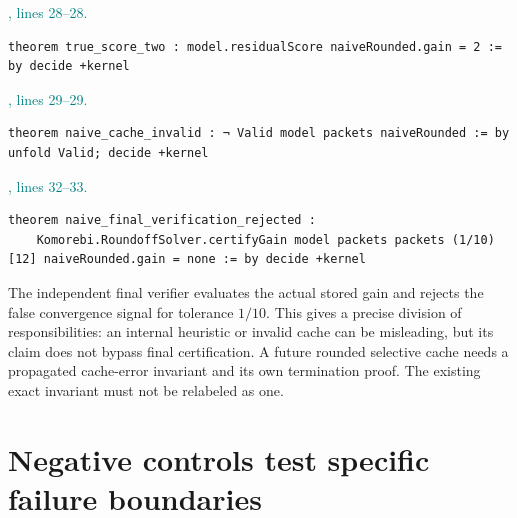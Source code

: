 \documentclass[11pt]{article}\usepackage{needspace}\renewcommand{\paperkind}{Lean companion}\setlength{\parskip}{0.35em}
\begin{document}
{\small\textcolor{teal}{, lines 28--28.}\par}

\begin{lstlisting}[style=BayesSource]
theorem true_score_two : model.residualScore naiveRounded.gain = 2 := by decide +kernel
\end{lstlisting}



{\small\textcolor{teal}{, lines 29--29.}\par}

\begin{lstlisting}[style=BayesSource]
theorem naive_cache_invalid : ¬ Valid model packets naiveRounded := by unfold Valid; decide +kernel
\end{lstlisting}



{\small\textcolor{teal}{, lines 32--33.}\par}

\begin{lstlisting}[style=BayesSource]
theorem naive_final_verification_rejected :
    Komorebi.RoundoffSolver.certifyGain model packets packets (1/10) [12] naiveRounded.gain = none := by decide +kernel
\end{lstlisting}

The independent final verifier evaluates the actual stored gain and rejects the false convergence signal for tolerance $1/10$. This gives a precise division of responsibilities: an internal heuristic or invalid cache can be misleading, but its claim does not bypass final certification. A future rounded selective cache needs a propagated cache-error invariant and its own termination proof. The existing exact invariant must not be relabeled as one.

\section{Negative controls test specific failure boundaries}
\end{document}
